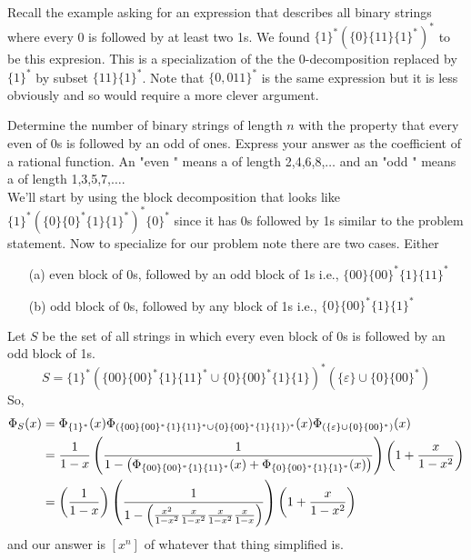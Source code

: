 \documentclass[english, 11pt]{article}
\begin{document}
       Recall the example asking for an expression that describes all binary strings where every 0 is followed by at least two 1s. We found $\{1\}^*(\{0\}\{11\}\{1\}^*)^*$ to be this expresion. This is a specialization of the the 0-decomposition replaced by $\{1\}^*$ by subset $\{11\}\{1\}^*$. Note that $\{0,011\}^*$ is the same expression but it is less obviously  and so would require a more clever argument.

       \begin{exmp}
         Determine the number of binary strings of length $n$ with the property that every even  of 0s is followed by an odd  of ones. Express your answer as the coefficient of a rational function. An "even " means a  of length 2,4,6,8,$\ldots$ and an "odd " means a  of length 1,3,5,7,$\ldots$. \\

         We'll start by using the block decomposition that looks like $\{1\}^*(\{0\}\{0\}^*\{1\}\{1\}^*)^*\{0\}^*$ since it has 0s followed by 1s similar to the problem statement. Now to specialize for our problem note there are two cases. Either
         \begin{itemize}
           \item[(a)] even block of 0s, followed by an odd block of 1s i.e., $\{00\}\{00\}^*\{1\}\{11\}^*$
           \item[(b)] odd block of 0s, followed by any block of 1s i.e., $\{0\}\{00\}^*\{1\}\{1\}^*$
         \end{itemize}
         Let $S$ be the set of all strings in which every even block of 0s is followed by an odd block of 1s.
         \[ S = \{1\}^*(\{00\}\{00\}^*\{1\}\{11\}^* \cup \{0\}\{00\}^*\{1\}\{1\})^*(\{\varepsilon\}\cup\{0\}\{00\}^*) \]
         So,
         \begin{align*}
           \Phi_S(x) & = \Phi_{\{1\}^*}(x)\Phi_{(\{00\}\{00\}^*\{1\}\{11\}^* \cup \{0\}\{00\}^*\{1\}\{1\})^*}(x)\Phi_{(\{\varepsilon\}\cup\{0\}\{00\}^*)}(x) \\
           & = \frac{1}{1-x} \left( \frac{1}{1- \left( \Phi_{\{00\}\{00\}^*\{1\}\{11\}^*}(x) + \Phi_{\{0\}\{00\}^*\{1\}\{1\}^*}(x) \right)} \right) \left( 1 + \frac{x}{1-x^2} \right) \\
           & = \left( \frac{1}{1-x} \right)\left( \frac{1}{1- \left( \frac{x^2}{1-x^2} \frac{x}{1-x^2} \frac{x}{1-x^2} \frac{x}{1-x} \right)} \right) \left( 1 + \frac{x}{1-x^2} \right)
         \end{align*}
         and our answer is $[x^n]$ of whatever that thing simplified is.

       \end{exmp}
\end{document}
